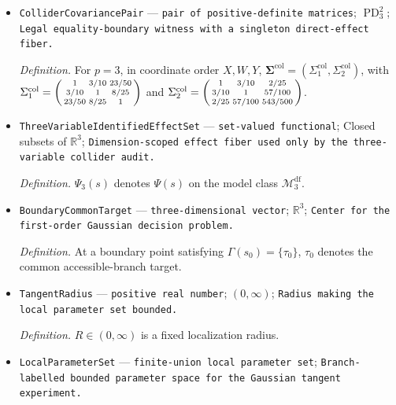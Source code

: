 \documentclass{article}
\begin{document}
\begin{itemize}
  \par\smallskip\noindent\emph{Definition.} For the three-variable audit only, \(p=3\) and \(W\) is the unique vertex in \(\mathbb V\setminus\{X,Y\}\).
  \item \texttt{ColliderCovariancePair} --- \texttt{pair of positive-\allowbreak{}definite matrices}; \(\operatorname{PD}_3^2\); \texttt{Legal equality-\allowbreak{}boundary witness with a singleton direct-\allowbreak{}effect fiber.}
  \par\smallskip\noindent\emph{Definition.} For \(p=3\), in coordinate order \(X,W,Y\), \(\boldsymbol\Sigma^{\mathrm{col}}=(\Sigma^{\mathrm{col}}_1,\Sigma^{\mathrm{col}}_2)\), with \(\Sigma^{\mathrm{col}}_1=\begin{psmallmatrix}1&3/10&23/50\\3/10&1&8/25\\23/50&8/25&1\end{psmallmatrix}\) and \(\Sigma^{\mathrm{col}}_2=\begin{psmallmatrix}1&3/10&2/25\\3/10&1&57/100\\2/25&57/100&543/500\end{psmallmatrix}\).
  \item \texttt{ThreeVariableIdentifiedEffectSet} --- \texttt{set-\allowbreak{}valued functional}; Closed subsets of \(\mathbb R^3\); \texttt{Dimension-\allowbreak{}scoped effect fiber used only by the three-\allowbreak{}variable collider audit.}
  \par\smallskip\noindent\emph{Definition.} \(\Psi_3(s)\) denotes \(\Psi(s)\) on the model class \(\mathcal M_3^{\mathrm{df}}\).
  \item \texttt{BoundaryCommonTarget} --- \texttt{three-\allowbreak{}dimensional vector}; \(\mathbb R^3\); \texttt{Center for the first-\allowbreak{}order Gaussian decision problem.}
  \par\smallskip\noindent\emph{Definition.} At a boundary point satisfying \(\Gamma(s_0)=\{\tau_0\}\), \(\tau_0\) denotes the common accessible-branch target.
  \item \texttt{TangentRadius} --- \texttt{positive real number}; \((0,\infty)\); \texttt{Radius making the local parameter set bounded.}
  \par\smallskip\noindent\emph{Definition.} \(R\in(0,\infty)\) is a fixed localization radius.
  \item \texttt{LocalParameterSet} --- \texttt{finite-\allowbreak{}union local parameter set}; \texttt{Branch-\allowbreak{}labelled bounded parameter space for the Gaussian tangent experiment.}

\end{itemize}
\end{document}
